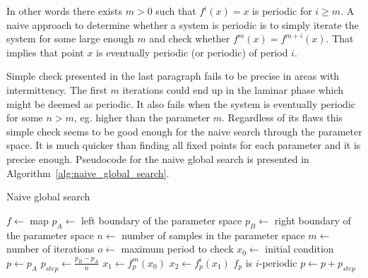 In other words there exists $m > 0$ such that $f^{i}(x)=x$ is periodic for $i \geq m$.
A naive approach to determine whether a system is periodic is to simply iterate the system for some large enough $m$ and check whether $f^{m}(x)=f^{m+i}(x)$.
That implies that point $x$ is eventually periodic (or periodic) of period $i$.
\par
Simple check presented in the last paragraph fails to be precise in areas with intermittency.
The first $m$ iterations could end up in the laminar phase which might be deemed as periodic.
It also fails when the system is eventually periodic for some $n > m$, eg. higher than the parameter $m$.
Regardless of its flaws this simple check seems to be good enough for the naive search through the parameter space.
It is much quicker than finding all fixed points for each parameter and it is precise enough.
Pseudocode for the naive global search is presented in Algorithm~\ref{alg:naive_global_search}.

\begin{algorithm}[!h]
    \caption{Naive global search}
    \label{alg:naive_global_search}
    \begin{algorithmic}[1]
        \Statex $f \gets$ map
        \Statex $p_{A} \gets$ left boundary of the parameter space
        \Statex $p_{B} \gets$ right boundary of the parameter space
        \Statex $n \gets$ number of samples in the parameter space
        \Statex $m \gets$ number of iterations
        \Statex $o \gets$ maximum period to check
        \Statex $x_0 \gets$ initial condition
        \State $p \gets p_{A}$
        \State $p_{step} \gets \frac{p_{B} - p_{A}}{n}$
            \State $x_1 \gets f_{p}^{m}(x_0)$
                \State $x_2 \gets f_{p}^{i}(x_1)$
                    \State $f_p$ is $i$-periodic
                \EndIf
            \EndFor
            \State $p \gets p + p_{step}$
        \EndWhile
    \end{algorithmic}
\end{algorithm}

